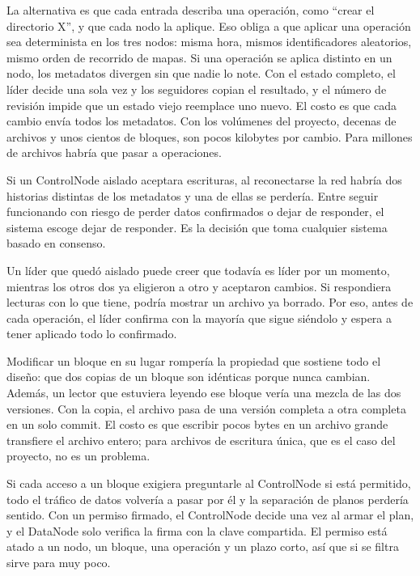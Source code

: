 \documentclass[10pt]{article}
\begin{document}
 La alternativa es que cada entrada describa una operación, como ``crear el directorio X'', y que cada nodo la aplique. Eso obliga a que aplicar una operación sea determinista en los tres nodos: misma hora, mismos identificadores aleatorios, mismo orden de recorrido de mapas. Si una operación se aplica distinto en un nodo, los metadatos divergen sin que nadie lo note. Con el estado completo, el líder decide una sola vez y los seguidores copian el resultado, y el número de revisión impide que un estado viejo reemplace uno nuevo. El costo es que cada cambio envía todos los metadatos. Con los volúmenes del proyecto, decenas de archivos y unos cientos de bloques, son pocos kilobytes por cambio. Para millones de archivos habría que pasar a operaciones.

 Si un ControlNode aislado aceptara escrituras, al reconectarse la red habría dos historias distintas de los metadatos y una de ellas se perdería. Entre seguir funcionando con riesgo de perder datos confirmados o dejar de responder, el sistema escoge dejar de responder. Es la decisión que toma cualquier sistema basado en consenso.

 Un líder que quedó aislado puede creer que todavía es líder por un momento, mientras los otros dos ya eligieron a otro y aceptaron cambios. Si respondiera lecturas con lo que tiene, podría mostrar un archivo ya borrado. Por eso, antes de cada operación, el líder confirma con la mayoría que sigue siéndolo y espera a tener aplicado todo lo confirmado.

 Modificar un bloque en su lugar rompería la propiedad que sostiene todo el diseño: que dos copias de un bloque son idénticas porque nunca cambian. Además, un lector que estuviera leyendo ese bloque vería una mezcla de las dos versiones. Con la copia, el archivo pasa de una versión completa a otra completa en un solo commit. El costo es que escribir pocos bytes en un archivo grande transfiere el archivo entero; para archivos de escritura única, que es el caso del proyecto, no es un problema.

 Si cada acceso a un bloque exigiera preguntarle al ControlNode si está permitido, todo el tráfico de datos volvería a pasar por él y la separación de planos perdería sentido. Con un permiso firmado, el ControlNode decide una vez al armar el plan, y el DataNode solo verifica la firma con la clave compartida. El permiso está atado a un nodo, un bloque, una operación y un plazo corto, así que si se filtra sirve para muy poco.
\end{document}
